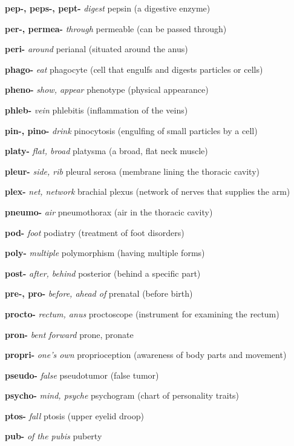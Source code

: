 \documentclass[10pt]{article}
\begin{document}
\begin{multicols}{2}
\begin{hangparas}{10pt}{1}
 \textbf{pep-, peps-, pept-} \textit{digest} pepsin (a digestive enzyme) \par
 \textbf{per-, permea-} \textit{through} permeable (can be passed through) \par
 \textbf{peri-} \textit{around} perianal (situated around the anus) \par
 \textbf{phago-} \textit{eat} phagocyte (cell that engulfs and digests particles or cells) \par
 \textbf{pheno-} \textit{show, appear} phenotype (physical appearance) \par
 \textbf{phleb-} \textit{vein} phlebitis (inflammation of the veins) \par
 \textbf{pin-, pino-} \textit{drink} pinocytosis (engulfing of small particles by a cell) \par
 \textbf{platy-} \textit{flat, broad} platysma (a broad, flat neck muscle) \par
 \textbf{pleur-} \textit{side, rib} pleural serosa (membrane lining the thoracic cavity) \par
 \textbf{plex-} \textit{net, network} brachial plexus (network of nerves that supplies the arm) \par
 \textbf{pneumo-} \textit{air} pneumothorax (air in the thoracic cavity) \par
 \textbf{pod-} \textit{foot} podiatry (treatment of foot disorders) \par
 \textbf{poly-} \textit{multiple} polymorphism (having multiple forms) \par
 \textbf{post-} \textit{after, behind} posterior (behind a specific part) \par
 \textbf{pre-, pro-} \textit{before, ahead of} prenatal (before birth) \par
 \textbf{procto-} \textit{rectum, anus} proctoscope (instrument for examining the rectum) \par
 \textbf{pron-} \textit{bent forward} prone, pronate \par
 \textbf{propri-} \textit{one's own} proprioception (awareness of body parts and movement) \par
 \textbf{pseudo-} \textit{false} pseudotumor (false tumor) \par
 \textbf{psycho-} \textit{mind, psyche} psychogram (chart of personality traits) \par
 \textbf{ptos-} \textit{fall} ptosis (upper eyelid droop) \par
 \textbf{pub-} \textit{of the pubis} puberty \par

\end{hangparas}
\end{multicols}
\end{document}
